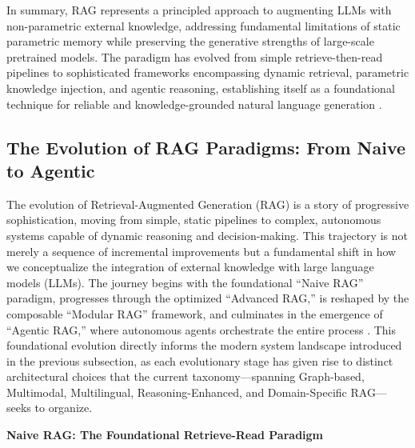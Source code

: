 \documentclass[11pt]{article}
\begin{document}
In summary, RAG represents a principled approach to augmenting LLMs with non-parametric external knowledge, addressing fundamental limitations of static parametric memory while preserving the generative strengths of large-scale pretrained models. The paradigm has evolved from simple retrieve-then-read pipelines to sophisticated frameworks encompassing dynamic retrieval, parametric knowledge injection, and agentic reasoning, establishing itself as a foundational technique for reliable and knowledge-grounded natural language generation \cite{ref19,ref21}.

\subsection{The Evolution of RAG Paradigms: From Naive to Agentic}

The evolution of Retrieval-Augmented Generation (RAG) is a story of progressive sophistication, moving from simple, static pipelines to complex, autonomous systems capable of dynamic reasoning and decision-making. This trajectory is not merely a sequence of incremental improvements but a fundamental shift in how we conceptualize the integration of external knowledge with large language models (LLMs). The journey begins with the foundational ``Naive RAG'' paradigm, progresses through the optimized ``Advanced RAG,'' is reshaped by the composable ``Modular RAG'' framework, and culminates in the emergence of ``Agentic RAG,'' where autonomous agents orchestrate the entire process \cite{ref22}. This foundational evolution directly informs the modern system landscape introduced in the previous subsection, as each evolutionary stage has given rise to distinct architectural choices that the current taxonomy---spanning Graph-based, Multimodal, Multilingual, Reasoning-Enhanced, and Domain-Specific RAG---seeks to organize.

\textbf{Naive RAG: The Foundational Retrieve-Read Paradigm}
\end{document}
